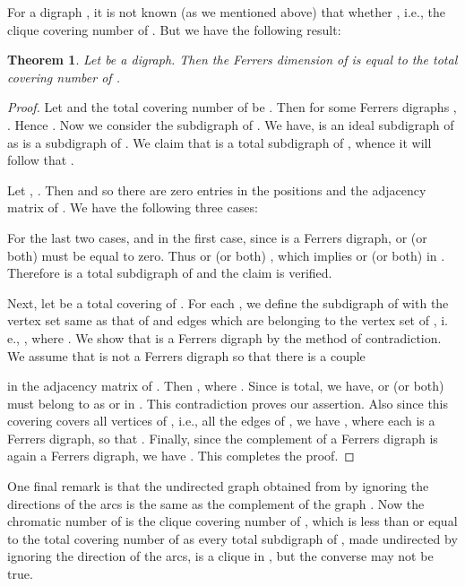 \documentclass[11pt]{article}
\newtheorem{thm}{Theorem}[section]
\theoremstyle{definition}
\theoremstyle{remark}
\numberwithin{equation}{section}
\begin{document}
For a digraph , it is not known (as we mentioned above) that whether , i.e., the clique covering number of . But we have the following result:
\begin{thm} \label{thm:beta2}
Let  be a digraph. Then the Ferrers dimension of  is equal to the total covering number of .
\end{thm}

\begin{proof}
Let  and the total covering number of  be . Then  for some Ferrers digraphs , . Hence . Now we consider the subdigraph  of . We have,  is an ideal subdigraph of  as  is a subdigraph of . We claim that  is a total subdigraph of , whence it will follow that .

\vspace{1em}Let , . Then  and so there are zero entries in the positions  and  the adjacency matrix of . We have the following three cases:


For the last two cases,  and in the first case, since  is a Ferrers digraph,  or  (or both) must be equal to zero. Thus  or  (or both) , which implies  or  (or both) in . Therefore  is a total subdigraph of  and the claim is verified.

\vspace{1em}Next, let  be a total covering of . For each , we define the subdigraph  of  with the vertex set same as that of  and edges which are belonging to the vertex set of , i. e., , where . We show that  is a Ferrers digraph by the method of contradiction. We assume that  is not a Ferrers digraph so that there is a couple

in the adjacency matrix of . Then , where . Since  is total, we have,  or  (or both) must belong to  as  or  in . This contradiction proves our assertion. Also since this covering covers all vertices of , i.e., all the edges of , we have , where each  is a Ferrers digraph, so that . Finally, since the complement of a Ferrers digraph is again a Ferrers digraph, we have . This completes the proof.
\end{proof} 

One final remark is that the undirected graph obtained from  by ignoring the directions of the arcs is the same as the complement of the graph . Now the chromatic number of  is the clique covering number of , which is less than or equal to the total covering number of  as every total subdigraph of , made undirected by ignoring the direction of the arcs, is a clique in , but the converse may not be true.
\end{document}
